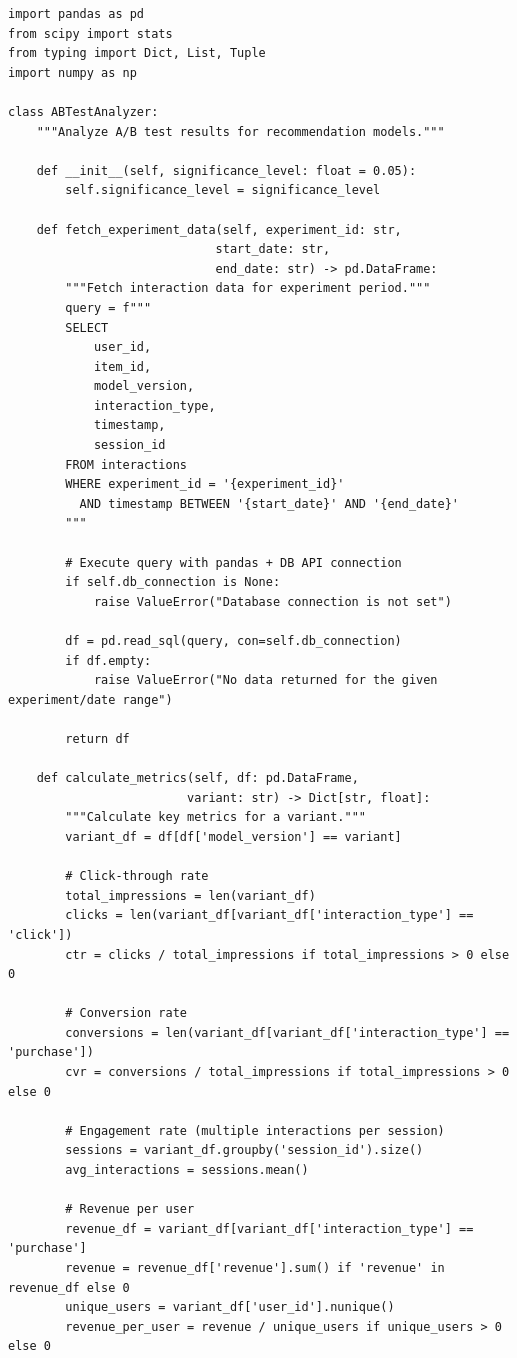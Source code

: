 \begin{lstlisting}[style=python, caption=A/B Test Analysis]
import pandas as pd
from scipy import stats
from typing import Dict, List, Tuple
import numpy as np

class ABTestAnalyzer:
    """Analyze A/B test results for recommendation models."""

    def __init__(self, significance_level: float = 0.05):
        self.significance_level = significance_level

    def fetch_experiment_data(self, experiment_id: str,
                             start_date: str,
                             end_date: str) -> pd.DataFrame:
        """Fetch interaction data for experiment period."""
        query = f"""
        SELECT
            user_id,
            item_id,
            model_version,
            interaction_type,
            timestamp,
            session_id
        FROM interactions
        WHERE experiment_id = '{experiment_id}'
          AND timestamp BETWEEN '{start_date}' AND '{end_date}'
        """

        # Execute query with pandas + DB API connection
        if self.db_connection is None:
            raise ValueError("Database connection is not set")

        df = pd.read_sql(query, con=self.db_connection)
        if df.empty:
            raise ValueError("No data returned for the given experiment/date range")

        return df

    def calculate_metrics(self, df: pd.DataFrame,
                         variant: str) -> Dict[str, float]:
        """Calculate key metrics for a variant."""
        variant_df = df[df['model_version'] == variant]

        # Click-through rate
        total_impressions = len(variant_df)
        clicks = len(variant_df[variant_df['interaction_type'] == 'click'])
        ctr = clicks / total_impressions if total_impressions > 0 else 0

        # Conversion rate
        conversions = len(variant_df[variant_df['interaction_type'] == 'purchase'])
        cvr = conversions / total_impressions if total_impressions > 0 else 0

        # Engagement rate (multiple interactions per session)
        sessions = variant_df.groupby('session_id').size()
        avg_interactions = sessions.mean()

        # Revenue per user
        revenue_df = variant_df[variant_df['interaction_type'] == 'purchase']
        revenue = revenue_df['revenue'].sum() if 'revenue' in revenue_df else 0
        unique_users = variant_df['user_id'].nunique()
        revenue_per_user = revenue / unique_users if unique_users > 0 else 0


\end{lstlisting}
